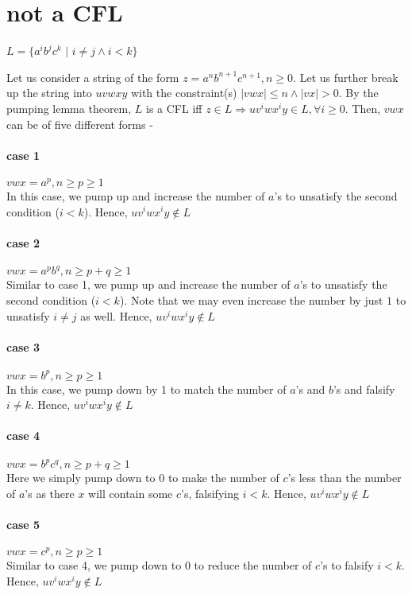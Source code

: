 \documentclass[11pt,letterpaper]{article}
\begin{document}
\section{not a CFL}
\begin{center}
    $L = \{a^i b^j c^k$ $|$ $i \neq j \wedge i<k\}$
\end{center}
Let us consider a string of the form $z = a^n b^{n+1} c^{n+1}, n \geq 0$. Let us further break up the string into $uvwxy$ with the constraint(s) $|vwx| \leq n \wedge |vx| > 0$. By the pumping lemma theorem, $L$ is a CFL iff $z \in L \Rightarrow uv^iwx^iy \in L, \forall i \geq 0$. Then, $vwx$ can be of five different forms -
\paragraph{case 1} $vwx = a^p, n \geq p \geq 1$ \\
In this case, we pump up and increase the number of $a$'s to unsatisfy the second condition ($i<k$). Hence, $uv^iwx^iy \notin L$
\paragraph{case 2} $vwx = a^pb^q, n \geq p+q \geq 1$ \\
Similar to case 1, we pump up and increase the number of $a$'s to unsatisfy the second condition ($i<k$). Note that we may even increase the number by just $1$ to unsatisfy $i \neq j$ as well. Hence, $uv^iwx^iy \notin L$
\paragraph{case 3} $vwx = b^p, n \geq p \geq 1$ \\
In this case, we pump down by 1 to match the number of $a$'s and $b$'s and falsify $i \neq k$. Hence, $uv^iwx^iy \notin L$
\paragraph{case 4} $vwx = b^pc^q, n \geq p+q \geq 1$ \\
Here we simply pump down to $0$ to make the number of $c$'s less than the number of $a$'s as there $x$ will contain some $c$'s, falsifying $i < k$. Hence, $uv^iwx^iy \notin L$
\paragraph{case 5} $vwx = c^p, n \geq p \geq 1$ \\
Similar to case 4, we pump down to $0$ to reduce the number of $c$'s to falsify $i<k$. Hence, $uv^iwx^iy \notin L$
\end{document}
